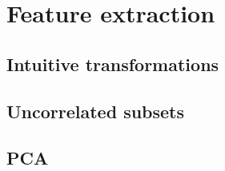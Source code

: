 \section{Feature extraction}

\subsection{Intuitive transformations}


\subsection{Uncorrelated subsets}


\subsection{PCA}